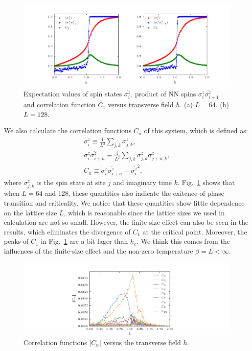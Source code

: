 \documentclass{article}
\theoremstyle{plain} \newtheorem{thm}{Theorem}[section]
\theoremstyle{definition} \newtheorem{df}{Definition}[section]
\theoremstyle{definition} \newtheorem{eg}{Example}
\theoremstyle{remark} \newtheorem*{rmk}{Remark}
\begin{document}
\begin{figure}[htpb]
  \centering
  \includegraphics[width=\textwidth]{figs/correlation_functions.pdf}
  \caption{Expectation values of spin states $\overline{\sigma_i^z}$, product of NN spins $\overline{\sigma_i^z \sigma_{i+1}^z}$ and correlation function $C_1$ versus transverse field $h$. (a) $L = 64$. (b) $L = 128$.}
  \label{fig:correlation_functions}
\end{figure}

We also calculate the correlation functions $C_n$ of this system, which is defined as:
\begin{gather}
  \overline{\sigma_i^z} \equiv \frac{1}{L^2}\sum_{j,k}\sigma_{j,k}^z,\\
  \overline{\sigma_i^z \sigma_{i+n}^z} \equiv \frac{1}{L^2} \sum_{j,k}\sigma_{j,k}^z \sigma_{j+n,k}^z,\\
  C_n \equiv \overline{\sigma_i^z \sigma_{i+n}^z}-\overline{\sigma_i^z}^2,
\end{gather}
where $\sigma_{j,k}^z$ is the spin state at site $j$ and imaginary time $k$. Fig.~\ref{fig:correlation_functions} shows that when $L = 64$ and $128$, these quantities also indicate the exitence of phase transition and criticality. We notice that these quantities show little dependence on the lattice size $L$, which is reasonable since the lattice sizes we used in calculation are not so small. However, the finite-size effect can also be seen in the results, which eliminates the divergence of $C_1$ at the critical point. Moreover, the peaks of $C_1$ in Fig.~\ref{fig:correlation_functions} are a bit lager than $h_c$. We think this comes from the influences of the finite-size effect and the non-zero temperature $\beta = L < \infty$.

\begin{figure}[htpb]
  \centering
  \includegraphics[width=\textwidth]{figs/C_n.pdf}
  \caption{Correlation functions $|C_n|$ versus the transverse field $h$.}
  \label{fig:C_n}
\end{figure}
\end{document}

